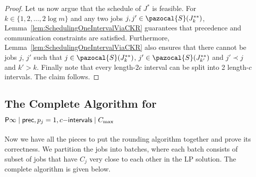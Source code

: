 \begin{proof}
Let us now argue that the schedule of $J^*$ is feasible. 
For $k \in \{ 1,2, \ldots, 2\log m\}$ and any two jobs $j, j' \in \pazocal{S}(J^{**}_k)$,  Lemma~\ref{lem:SchedulingOneIntervalViaCKR}  guarantees that precedence and communication constraints are satisfied.
Furthermore, Lemma~\ref{lem:SchedulingOneIntervalViaCKR} also ensures that there cannot be jobs  $j$, $j'$ such that  $j \in \pazocal{S}(J^{**}_k)$, $j' \in \pazocal{S}(J^{**}_{k'})$ and $j' \prec j$ and $k' > k$. Finally note that every length-$2c$ interval can be split into 2 length-$c$ intervals.
The claim follows.
\end{proof}



\subsection{The Complete Algorithm for $\mathsf{P} \infty \mid \mathsf{prec}, p_j=1, c\mathsf{-intervals} \mid C_{\max}$ }\label{sec:TheCompleteAlgorithm}

Now we have all the pieces to put the rounding algorithm together and prove its correctness.
We partition the jobs into batches, where each batch consists of subset of jobs that have  $C_j$ very close to each other in the LP solution. 
The complete algorithm is given below.

\begin{center}
\end{center}

